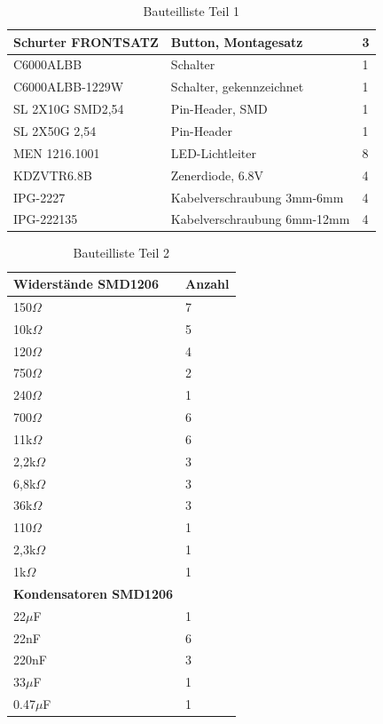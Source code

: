 \begin{table}[H]
{\begin{tabular}{|l|l|l|}
			Schurter FRONTSATZ & Button, Montagesatz & 3 \\ \hline
			C6000ALBB & Schalter & 1 \\ \hline
			C6000ALBB-1229W & Schalter, gekennzeichnet & 1 \\ \hline
			SL 2X10G SMD2,54 & Pin-Header, SMD & 1 \\ \hline
			SL 2X50G 2,54 & Pin-Header & 1 \\ \hline
			MEN 1216.1001 & LED-Lichtleiter & 8 \\ \hline
			KDZVTR6.8B & Zenerdiode, 6.8V & 4 \\ \hline
			IPG-2227 & Kabelverschraubung 3mm-6mm & 4 \\ \hline
			IPG-222135 & Kabelverschraubung 6mm-12mm & 4 \\ \hline
		\end{tabular}%
	}
	\caption{Bauteilliste Teil 1}
	\label{tab:Verwendeten Bauteile}
\end{table}
\begin{table}[H]
	\centering
	\begin{tabular}{|l|l|}
		\hline
		\textbf{Widerstände SMD1206} & \textbf{Anzahl} \\ \hline
		150$\Omega$ & 7 \\ \hline
		10k$\Omega$ & 5 \\ \hline
		120$\Omega$ & 4 \\ \hline
		750$\Omega$ & 2 \\ \hline
		240$\Omega$ & 1 \\ \hline
		700$\Omega$ & 6 \\ \hline
		11k$\Omega$ & 6 \\ \hline
		2,2k$\Omega$ & 3 \\ \hline
		6,8k$\Omega$ & 3 \\ \hline
		36k$\Omega$ & 3 \\ \hline
		110$\Omega$ & 1 \\ \hline
		2,3k$\Omega$ & 1 \\ \hline
		1k$\Omega$ & 1 \\ \hline
		\textbf{Kondensatoren SMD1206} &  \\ \hline
		22$\mu$F & 1 \\ \hline
		22nF & 6 \\ \hline
		220nF & 3 \\ \hline
		33$\mu$F & 1 \\ \hline
		0.47$\mu$F & 1 \\ \hline
	\end{tabular}
	\caption{Bauteilliste Teil 2}
	\label{tab:Bauteile2}
\end{table}
\newpage
